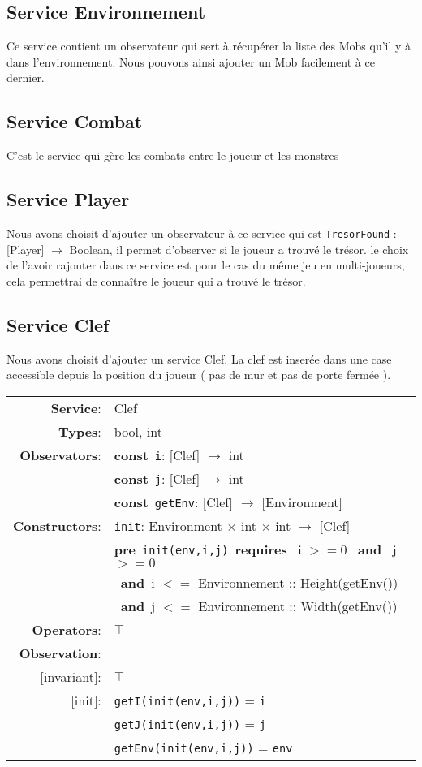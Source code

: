 \documentclass{article}
\begin{document}
\subsection{Service Environnement }
Ce service contient un observateur qui sert à récupérer la liste des Mobs qu'il y à dans l'environnement.
Nous pouvons ainsi ajouter un Mob facilement à ce dernier.
\subsection{Service Combat }
C'est le service qui gère les combats entre le joueur et les monstres 
\subsection{Service Player}
Nous avons choisit d'ajouter un observateur à ce service qui est \texttt{TresorFound} : \textrm{[Player]} $\rightarrow$ \textrm{Boolean}, il permet d'observer si le joueur a trouvé le trésor. le choix de l'avoir rajouter dans ce service est pour le cas du même jeu en multi-joueurs, cela permettrai de connaître le joueur qui a trouvé le trésor.

\subsection{Service Clef }
Nous avons choisit d'ajouter un service Clef.
La clef est inserée dans une case accessible depuis la position du joueur ( pas de mur et pas de porte fermée ).
\\
\begin{tabular}{rl}
\textbf{Service}: & \textrm{Clef}  \\
\textbf{Types}: & \textrm{bool}, \textrm{int} \\
\textbf{Observators}: & \textbf{const}~\texttt{i}: \textrm{[Clef]} $\rightarrow$ \textrm{int} \\
& \textbf{const}~\texttt{j}: \textrm{[Clef]} $\rightarrow$ \textrm{int} \\
& \textbf{const}~\texttt{getEnv}: \textrm{[Clef]} $\rightarrow$ \textrm{[Environment]} \\
\textbf{Constructors}: & \texttt{init}: \textrm{Environment} $\times$ \textrm{int} $\times$ \textrm{int} $\rightarrow$ \textrm{[Clef]} \\
& \quad\quad \textbf{pre}~\texttt{init(env,i,j)}~\textbf{requires}~ i $>=0$ ~\textbf{and}~ j$>=0$ \\ & \quad\quad\quad~\textbf{and}~i $<=$ Environnement :: Height(getEnv()) \\
& \quad\quad\quad~\textbf{and}~j $<=$ Environnement :: Width(getEnv()) \\
\textbf{Operators}: & $\top$ \\
       \textbf{Observation}: \\
       $[$invariant$]$: & $\top$ \\
       $[$init$]$: & \texttt{getI(init(env,i,j))} = \texttt{i} \\
       & \texttt{getJ(init(env,i,j))} = \texttt{j} \\
       & \texttt{getEnv(init(env,i,j))} = \texttt{env} \\
\end{tabular}
\end{document}
